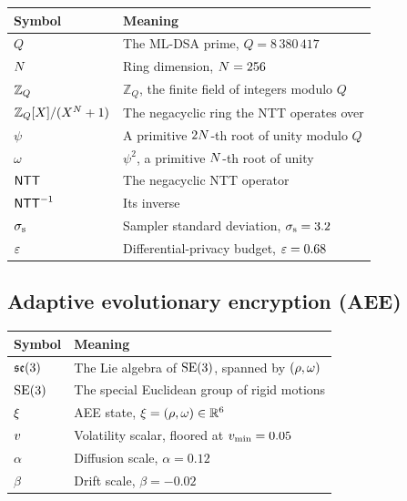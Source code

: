 \begin{center}
\begin{tabular}{ll}
\toprule
Symbol & Meaning \\
\midrule
$Q$              & The ML-DSA prime, $Q = 8\,380\,417$ \\
$N$          & Ring dimension, $N = 256$ \\
$\mathbb{Z}_Q$         & $\mathbb{Z}_Q$, the finite field of integers modulo $Q$ \\
$\mathbb{Z}_Q[X]/(X^{N}+1)$ & The negacyclic ring the NTT operates over \\
$\psi$           & A primitive $2N$-th root of unity modulo $Q$ \\
$\omega$         & $\psi^2$, a primitive $N$-th root of unity \\
$\mathsf{NTT}$           & The negacyclic NTT operator \\
$\mathsf{NTT}^{-1}$          & Its inverse \\
${\sigma_{\mathrm{s}}}$        & Sampler standard deviation, ${\sigma_{\mathrm{s}}} = 3.2$ \\
$\varepsilon$           & Differential-privacy budget, $\varepsilon = 0.68$ \\
\bottomrule
\end{tabular}
\end{center}

\subsection*{Adaptive evolutionary encryption (AEE)}

\begin{center}
\begin{tabular}{ll}
\toprule
Symbol & Meaning \\
\midrule
$\mathfrak{se}(3)$            & The Lie algebra of $\mathrm{SE}(3)$, spanned by $(\rho,\omega)$ \\
$\mathrm{SE}(3)$            & The special Euclidean group of rigid motions \\
$\xi$         & AEE state, $\xi = (\rho,\omega) \in \mathbb{R}^6$ \\
$v$    & Volatility scalar, floored at $v_{\min} = 0.05$ \\
$\alpha$         & Diffusion scale, $\alpha = 0.12$ \\
$\beta$          & Drift scale, $\beta = -0.02$ \\
\bottomrule
\end{tabular}
\end{center}

